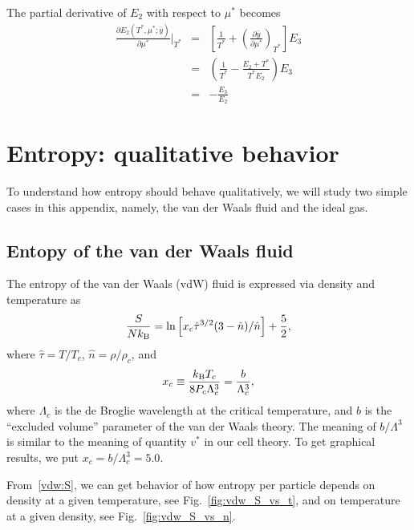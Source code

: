 \documentclass[12pt]{article}
\numberwithin{equation}{section}
\begin{document}
	The partial derivative of $E_2$ with respect to $\mu^*$ becomes
	\begin{eqnarray}
		\frac{\partial E_2(T^*,\mu^*;\bar{y})}{\partial \mu^*} \bigg|_{T^*} & = &
		\left[\frac{1}{T^*} + \left(\frac{\partial\bar{y}}{\partial \mu^*}\right)_{T^*}\right] E_3
		\nonumber\\
		& = & \left(\frac{1}{T^*} - \frac{E_2 + T^*}{T^* E_2}\right) E_3
		\nonumber\\
		& = & -\frac{E_3}{E_2}
	\end{eqnarray}
	
	\section{Entropy: qualitative behavior}
	To understand how entropy should behave qualitatively, we will study two simple cases in this appendix, namely, the van der Waals fluid and the ideal gas.
	
	\subsection{Entopy of the van der Waals fluid}
	The entropy of the van der Waals (vdW) fluid is expressed via density and temperature as~\cite[(55)]{Johnston14}
	\begin{equation}
		\label{vdw:S}
		\frac{S}{N k_{\rm B}} = \ln \left[x_c\hat{\tau}^{3/2}(3-\hat{n})/\hat{n}\right] + \frac{5}{2},
	\end{equation}
	where $\hat{\tau} = T/T_c$, $\hat{n} = \rho/\rho_c$, and 
	\begin{equation}
		x_c \equiv \frac{k_{\rm B} T_c}{8P_c \Lambda^3_c} = \frac{b}{\Lambda^3_c},
	\end{equation}
	where $\Lambda_c$ is the de Broglie wavelength at the critical temperature, and $b$ is the ``excluded volume'' parameter of the van der Waals theory. The meaning of $b/\Lambda^3$ is similar to the meaning of quantity $v^*$ in our cell theory. To get graphical results, we put $x_c = b/\Lambda_c^3 = 5.0$.
	
	From~\eqref{vdw:S}, we can get behavior of how entropy per particle depends on density at a given temperature, see Fig.~\ref{fig:vdw_S_vs_t}, and on temperature at a given density, see Fig.~\ref{fig:vdw_S_vs_n}. 
	
\end{document}
